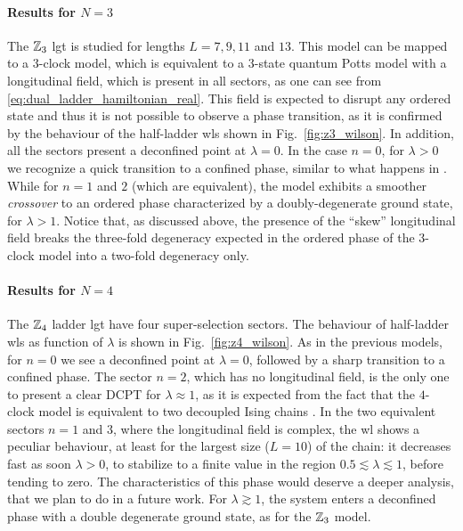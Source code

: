 \smallskip

\paragraph{Results for \texorpdfstring{$N=3$}{N=3}}%
The $\mathbb{Z}_3$ \ac{lgt} is studied for lengths $L=7,9,11$ and $13$.
This model can be mapped to a $3$-clock model, which is equivalent to a $3$-state quantum Potts model with a longitudinal field, which is present in all sectors, as one can see from \eqref{eq:dual_ladder_hamiltonian_real}.
This field is expected to disrupt any ordered state and thus it is not possible to observe a phase transition, as it is confirmed  by the behaviour of the half-ladder \ac{wl}s  shown in Fig.~\ref{fig:z3_wilson}.
In addition, all the sectors present a deconfined point at $\lambda = 0$.
In the case $n=0$, for $\lambda > 0$ we recognize a quick transition to a confined phase, similar to what happens in \cite{burrello2021ladder}.
While for $n=1$ and $2$ (which are equivalent), the model exhibits a smoother \emph{crossover} to an ordered phase characterized by a doubly-degenerate ground state, for $\lambda > 1$.
Notice that, as discussed above,  the presence of the ``skew'' longitudinal field breaks the three-fold degeneracy expected in the ordered phase of the $3$-clock model into a two-fold degeneracy only.

\smallskip

\paragraph{Results for \texorpdfstring{$N=4$}{N=4}}%
The $\mathbb{Z}_4$ ladder \ac{lgt} have four super-selection sectors.
The behaviour of half-ladder \ac{wl}s as function of $\lambda$ is shown in Fig.~\ref{fig:z4_wilson}.
As in the previous models, for $n=0$ we see a deconfined point at $\lambda = 0$, followed by a sharp transition to a confined phase.
The sector $n=2$, which has no longitudinal field, is the only one to present a clear DCPT for $\lambda \approx 1$, as it is expected from the fact that the $4$-clock model is equivalent to two decoupled Ising chains \cite{ortiz2012dualities}.
In the two equivalent sectors $n=1$ and $3$, where the longitudinal field is complex, the \ac{wl} shows a peculiar behaviour, at least for the largest size ($L=10$) of the chain: it decreases fast as soon $\lambda > 0$, to stabilize to a finite value in the region $0.5 \lesssim \lambda \lesssim 1$, before tending to zero.
The characteristics of this phase would deserve a deeper analysis, that we plan to do in a future work.
For $\lambda \gtrsim 1$, the system enters a deconfined phase with a double degenerate ground state, as for the $\mathbb{Z}_3$ model.


